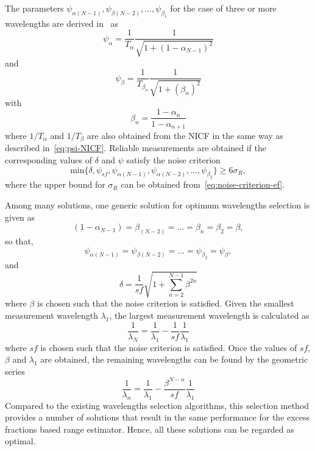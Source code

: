 The parameters $\psi_{\alpha(N-1)}, \psi_{\beta(N-2)}, \ldots, \psi_{\beta_1}$ for the case of three or more wavelengths are derived in~\cite{Falaggis_excess_fractions_2011} as
\[
\psi_{\alpha} = \frac{1}{T_{\alpha}} \frac{1}{\sqrt{1 + (1 - \alpha_{N-1})^2}}
\]
and
\[
\psi_{\beta} = \frac{1}{T_{\beta_n}} \frac{1}{\sqrt{1 + (\beta_n)^2}}
\]
with
\[
\beta_n = \frac{1 - \alpha_n}{1 - \alpha_{n+1}}
\]
where $1/T_{\alpha}$ and $1/T_{\beta}$ are also obtained from the NICF in the same way as described in~\ref{eq:psi-NICF}. Reliable measurements are obtained if the corresponding values of $\delta$ and $\psi$ satisfy the noise criterion
\[
\text{min} \{   \delta, \psi_{sf}, \psi_{\alpha(N-1)}, \psi_{\alpha(N-2)} , \ldots, \psi_{\beta_2}  \} \geq 6\sigma_R,
\]
where the upper bound for $\sigma_R$ can be obtained from~\ref{eq:noise-criterion-ef}.

Among many solutions, one generic solution for optimum wavelengths selection is given as~\cite{Falaggis_excess_fractions_2012}
\[
(1 - \alpha_{N-1}) = \beta_{(N-2)} = \ldots = \beta_n = \beta_2 = \beta,
\]
so that,
\[
\psi_{\alpha(N-1)} = \psi_{\beta(N-2)} = \ldots = \psi_{\beta_2} = \psi_{\beta},
\]
and
\[
\delta = \frac{1}{sf} \sqrt{1 + \sum_{n=2}^{N-1} \beta^{2n}}
\]
where $\beta$ is chosen such that the noise criterion is satisfied. Given the smallest measurement wavelength $\lambda_1$, the largest measurement wavelength is calculated as
\[
\frac{1}{\lambda_N} = \frac{1}{\lambda_1} - \frac{1}{sf}\frac{1}{\lambda_1}
\]
where $sf$ is chosen such that the noise criterion is satisfied. Once the values of $sf$, $\beta$ and $\lambda_1$ are obtained, the remaining wavelengths can be found by the geometric series~\cite{Falaggis_excess_fractions_2012}
\[
\frac{1}{\lambda_n} =  \frac{1}{\lambda_1} - \frac{\beta^{N-n}}{sf} \frac{1}{\lambda_1}
\]
Compared to the existing wavelengths selection algorithms, this selection method provides a number of solutions that result in the same performance for the excess fractions based range estimator. Hence, all these solutions can be regarded as optimal.

